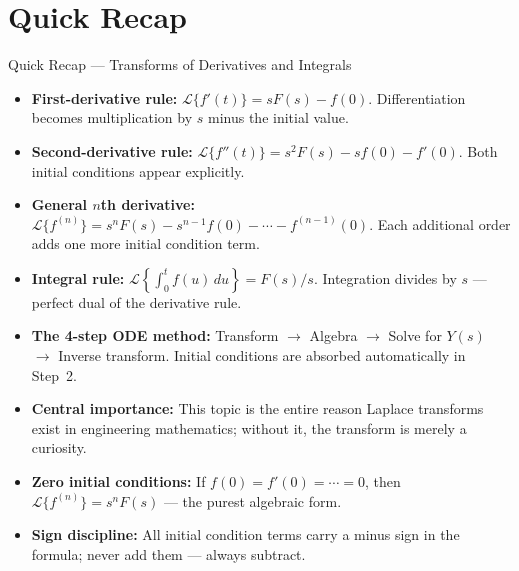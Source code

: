 \documentclass[12pt,a4paper]{article}
\begin{document}
\section{Quick Recap}

\begin{learnbox}{Quick Recap --- Transforms of Derivatives and Integrals}
\begin{itemize}
  \item \textbf{First-derivative rule:}
        \(\mathcal{L}\{f'(t)\} = sF(s) - f(0)\).
        Differentiation becomes multiplication by \(s\) minus the initial value.
  \item \textbf{Second-derivative rule:}
        \(\mathcal{L}\{f''(t)\} = s^2F(s) - sf(0) - f'(0)\).
        Both initial conditions appear explicitly.
  \item \textbf{General \(n\)th derivative:}
        \(\mathcal{L}\{f^{(n)}\} = s^nF(s) - s^{n-1}f(0) - \cdots - f^{(n-1)}(0)\).
        Each additional order adds one more initial condition term.
  \item \textbf{Integral rule:}
        \(\mathcal{L}\!\left\{\int_0^t f(u)\,du\right\} = F(s)/s\).
        Integration divides by \(s\) --- perfect dual of the derivative rule.
  \item \textbf{The 4-step ODE method:}
        Transform $\to$ Algebra $\to$ Solve for \(Y(s)\) $\to$ Inverse transform.
        Initial conditions are absorbed automatically in Step~2.
  \item \textbf{Central importance:}
        This topic is the entire reason Laplace transforms exist in engineering mathematics;
        without it, the transform is merely a curiosity.
  \item \textbf{Zero initial conditions:}
        If \(f(0)=f'(0)=\cdots=0\), then \(\mathcal{L}\{f^{(n)}\}=s^n F(s)\) ---
        the purest algebraic form.
  \item \textbf{Sign discipline:}
        All initial condition terms carry a minus sign in the formula;
        never add them --- always subtract.
\end{itemize}
\end{learnbox}
\end{document}
